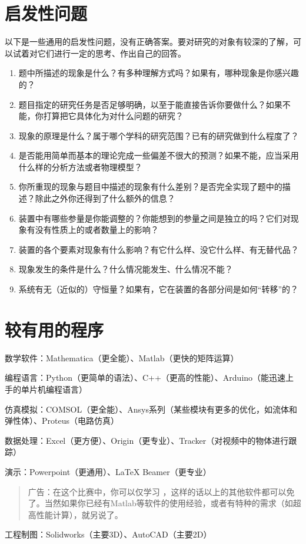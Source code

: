 \documentclass[a4paper,10pt,english]{sphinxmanual}
\begin{document}
\section{启发性问题}
\label{\detokenize{7. Appendix:id3}}
以下是一些通用的启发性问题，没有正确答案。要对研究的对象有较深的了解，可以试着对它们进行一定的思考、作出自己的回答。
\begin{enumerate}
\item {} 
题中所描述的现象是什么？有多种理解方式吗？如果有，哪种现象是你感兴趣的？

\item {} 
题目指定的研究任务是否足够明确，以至于能直接告诉你要做什么？如果不能，你打算把它具体化为对什么问题的研究？

\item {} 
现象的原理是什么？属于哪个学科的研究范围？已有的研究做到什么程度了？

\item {} 
是否能用简单而基本的理论完成一些偏差不很大的预测？如果不能，应当采用什么样的分析方法或者物理模型？

\item {} 
你所重现的现象与题目中描述的现象有什么差别？是否完全实现了题中的描述？除此之外你还得到了什么额外的信息？

\item {} 
装置中有哪些参量是你能调整的？你能想到的参量之间是独立的吗？它们对现象有没有性质上的或者数量上的影响？

\item {} 
装置的各个要素对现象有什么影响？有它什么样、没它什么样、有无替代品？

\item {} 
现象发生的条件是什么？什么情况能发生、什么情况不能？

\item {} 
系统有无（近似的）守恒量？如果有，它在装置的各部分间是如何“转移”的？

\end{enumerate}


\section{较有用的程序}
\label{\detokenize{7. Appendix:id4}}
数学软件：Mathematica（更全能）、Matlab（更快的矩阵运算）

编程语言：Python（更简单的语法）、C++（更高的性能）、Arduino（能迅速上手的单片机编程语言）

仿真模拟：COMSOL（更全能）、Ansys系列（某些模块有更多的优化，如流体和弹性体）、Proteus（电路仿真）

数据处理：Excel（更方便）、Origin（更专业）、Tracker（对视频中的物体进行跟踪）

演示：Powerpoint（更通用）、LaTeX Beamer（更专业）
\begin{quote}

广告：在这个比赛中，你可以仅学习  ，这样的话以上的其他软件都可以免了。当然如果你已经有Matlab等软件的使用经验，或者有特种的需求（如超高性能计算），就另说了。
\end{quote}

工程制图：Solidworks（主要3D）、AutoCAD（主要2D）



\renewcommand{\indexname}{索引}
\printindex
\end{document}
